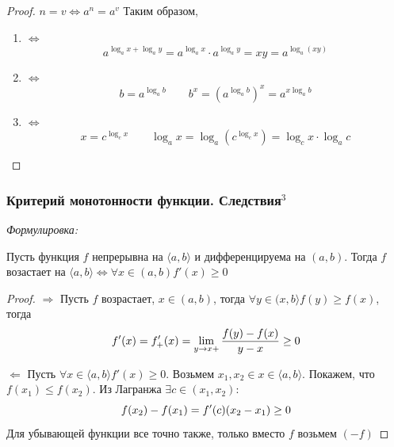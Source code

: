 \documentclass{article}
\begin{document}
\begin{proof}
$n = v \Leftrightarrow a^n = a^v$
Таким образом, 
\begin{enumerate}
\item $\Leftrightarrow$
\begin{equation*}
a^{\log_a x + \log_a y} = a^{\log_a x}\cdot a^{\log_a y} = xy =  a^{\log_a(xy)}
\end{equation*}
\item $\Leftrightarrow$
\begin{equation*}
b = a^{\log_a b} \qquad b^x = \left(a^{\log_a b}\right)^x = a^{x\log_a b}
\end{equation*}
\item $\Leftrightarrow$
\begin{equation*}
x = c^{\log_c x} \qquad \log_a x = \log_a\left(c^{\log_c x}\right) = \log_c x \cdot \log_a c
\end{equation*}
\end{enumerate}
\end{proof}

\subsubsection{Критерий монотонности функции. Следствия\texorpdfstring{$^3$}{}}

\textit{Формулировка: }

Пусть функция $f$ непрерывна на $\langle a, b\rangle$ и дифференцируема на $(a, b)$. Тогда $f$ возастает на $\langle a, b\rangle \Leftrightarrow \forall x \in (a, b) f'(x) \geq 0$

\begin{proof}
\item{$\Rightarrow$}
Пусть $f$ возрастает, $x \in (a, b)$, тогда $\forall y \in (x, b\rangle f(y) \geq f(x) $, тогда
\begin{equation}
f'(x) = f_+'(x) = \lim_{y\to x+} \frac{f(y) - f(x)}{y - x} \geq 0 \notag
\end{equation}
\item{$\Leftarrow$}
Пусть $\forall x \in \langle a, b\rangle f'(x) \geq 0$. Возьмем $x_1, x_2 \in x \in \langle a, b\rangle$. Покажем, что $f(x_1) \leq f(x_2)$. Из Лагранжа $\exists c \in (x_1, x_2):$
\begin{equation}
f(x_2) - f(x_1) = f'(c)(x_2 - x_1) \geq 0 \notag
\end{equation}
Для убывающей функции все точно также, только вместо $f$ возьмем $(-f)$
\end{proof}
\end{document}
